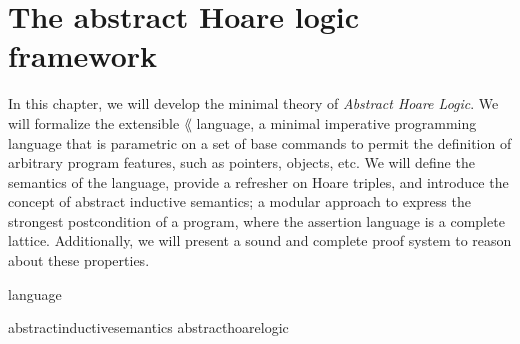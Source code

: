 \chapter{The abstract Hoare logic framework}


In this chapter, we will develop the minimal theory of \textit{Abstract Hoare 
Logic}. We will formalize the extensible $\lang$ language, a minimal imperative 
programming language that is parametric on a set of base commands to permit the 
definition of arbitrary program features, such as pointers, objects, etc. We 
will define the semantics of the language, provide a refresher on Hoare triples, 
and introduce the concept of abstract inductive semantics; a modular approach to 
express the strongest postcondition of a program, where the assertion language 
is a complete lattice. Additionally, we will present a sound and complete proof 
system to reason about these properties.

{language}

{abstractinductivesemantics}
{abstracthoarelogic}

